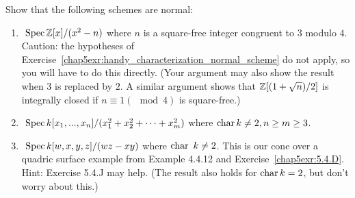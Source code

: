 \documentclass[11pt,fleqn]{book} %
\begin{document}
\begin{exr}\label{chap5exr:normal_schemes_examples}
Show that the following schemes are normal:
\begin{enumerate}[label=(\alph*)]
\item  $\text{ Spec\,}\mathbb Z[x]/(x^2-n)$ where $n$ is a square-free integer congruent to $3$ modulo $4$. Caution: the hypotheses of Exercise~\ref{chap5exr:handy_characterization_normal_scheme} do not apply, so you will have to do this directly. (Your argument may also show the result when $3$ is replaced by $2$. A similar argument shows that $\mathbb Z[(1+\sqrt{n})/2]$ is integrally closed if $n \equiv 1 (\mod 4)$ is square-free.)
\item
 $\text{ Spec\,} k[x_1,...,x_n]/(x^2_1+x_2^2+\cdots+x^2_m)$ where $\text{char\,} k\neq 2, n\geq m\geq 3$.
\item $\text{ Spec\,} k[w, x, y, z]/(wz - xy)$ where $\text{char\,}\ k\neq  2$. This is our cone over a quadric surface example from Example 4.4.12 and Exercise~\ref{chap5exr:5.4.D}. Hint: Exercise 5.4.J may help. (The result also holds for $\text{char\,} k = 2$, but don’t worry about this.)
\end{enumerate}
\end{exr}
\end{document}

